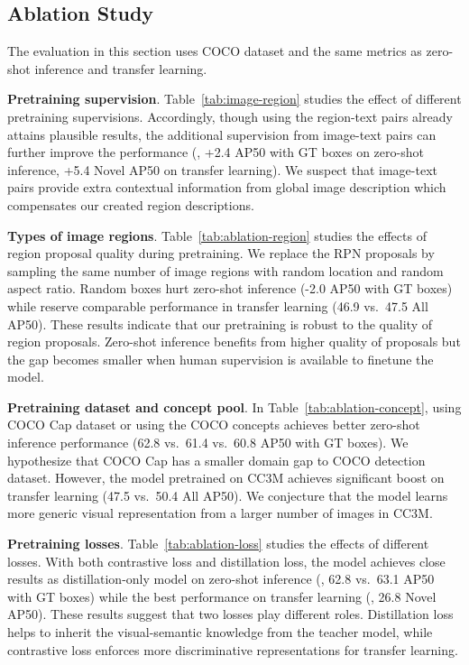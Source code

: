 \subsection{Ablation Study}
The evaluation in this section uses COCO dataset and the same metrics as zero-shot inference and transfer learning.

\smallskip
\noindent \textbf{Pretraining supervision}. Table~\ref{tab:image-region} studies the effect of different pretraining supervisions. Accordingly, though using the region-text pairs already attains plausible results, the additional supervision from image-text pairs can further improve the performance (\eg, +2.4 AP50 with GT boxes on zero-shot inference, +5.4 Novel AP50 on transfer learning). We suspect that image-text pairs provide extra contextual information from global image description which compensates our created region descriptions.

\smallskip
\noindent \textbf{Types of image regions}. Table~\ref{tab:ablation-region} studies the effects of region proposal quality during pretraining. We replace the RPN proposals by sampling the same number of image regions with random location and random aspect ratio. Random boxes hurt zero-shot inference (-2.0 AP50 with GT boxes) while reserve comparable performance in transfer learning (46.9 vs.\ 47.5 All AP50). These results indicate that our pretraining is robust to the quality of region proposals. Zero-shot inference benefits from higher quality of proposals but the gap becomes smaller when human supervision is available to finetune the model.

\smallskip
\noindent \textbf{Pretraining dataset and concept pool}. In Table~\ref{tab:ablation-concept}, using COCO Cap dataset or using the COCO concepts achieves better zero-shot inference performance (62.8 vs.\ 61.4 vs.\ 60.8 AP50 with GT boxes). We hypothesize that COCO Cap has a smaller domain gap to COCO detection dataset. However, the model pretrained on CC3M achieves significant boost on transfer learning (47.5 vs.\ 50.4 All AP50). We conjecture that the model learns more generic visual representation from a larger number of images in CC3M. 


\smallskip
\noindent \textbf{Pretraining losses}. Table~\ref{tab:ablation-loss} studies the effects of different losses. With both contrastive loss and distillation loss, the model achieves close results as distillation-only model on zero-shot inference (\eg, 62.8 vs.\ 63.1 AP50 with GT boxes) while the best performance on transfer learning (\eg, 26.8 Novel AP50). These results suggest that two losses play different roles. Distillation loss helps to inherit the visual-semantic knowledge from the teacher model, while contrastive loss enforces more discriminative representations for transfer learning. 



